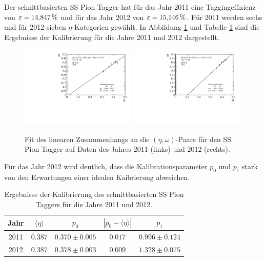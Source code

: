 Der schnittbasierten SS Pion Tagger hat für das Jahr \num{2011} eine Taggingeffizienz von $\varepsilon=\SI{14{,}847}{\%}$ und für das Jahr \num{2012} von $\varepsilon=\SI{15{,}146}{\%}$. Für \num{2011} werden sechs und für \num{2012} sieben $\eta$-Kategorien gewählt. In Abbildung \ref{fig:fit_SSPion} und Tabelle \ref{tab:result_SSPion} sind die Ergebnisse der Kalibrierung für die Jahre \num{2011} und \num{2012} dargestellt.
\begin{figure}[htbp]
	\centering
		\includegraphics[width=0.49\textwidth]{fig/2011_SSPion.pdf}
		\includegraphics[width=0.49\textwidth]{fig/2012_SSPion.pdf}
	\caption{Fit des linearen Zusammenhangs an die $(\eta,\omega)$-Paare für den SS Pion Tagger auf Daten des Jahres \num{2011} (links) und \num{2012} (rechts).}
	\label{fig:fit_SSPion} 
\end{figure}
Für das Jahr \num{2012} wird deutlich, dass die Kalibrationsparameter $p_0$ und $p_1$ stark von den Erwartungen einer idealen Kaibrierung abweichen.
\begin{table}[htbp]
	\centering
	\caption{Ergebnisse der Kalibrierung des schnittbasierten SS Pion Taggers für die Jahre \num{2011} und \num{2012}.}
	\label{tab:result_SSPion}
	\begin{tabular}{ccccc}
	\toprule
       Jahr & $\langle\eta\rangle$ & $p_0$ & $\left|p_0-\langle\eta\rangle\right|$ & $p_1$ \\
       \midrule
	2011 & $0{.}387$ & $0{.}370\pm0{.}005$ & $0{.}017$ & $0{.}996\pm0{.}124$ \\
   2012 & $0{.}387$ & $0{.}378\pm0{.}003$ & $0{.}009$ & $1{.}328\pm0{.}075$ \\ 
   \bottomrule
	\end{tabular}
\end{table}
